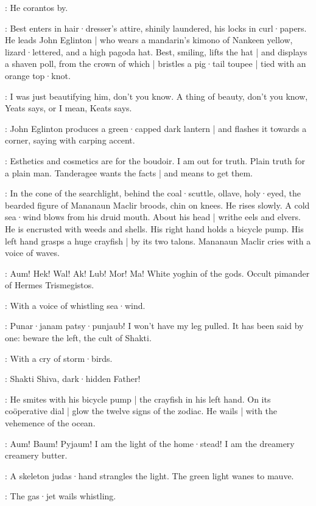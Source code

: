 :
He corantos by.

:
Best enters in hair·dresser's attire,
shinily laundered,
his locks in curl·papers.
He leads John Eglinton |
who wears a mandarin's kimono of Nankeen yellow,
lizard·lettered,
and a high pagoda hat.
Best,
smiling,
lifts the hat |
and displays a shaven poll,
from the crown of which |
bristles a pig·tail toupee |
tied with an orange top·knot.

\Best:
I was just beautifying him,
don't you know.
A thing of beauty,
don't you know,
Yeats says,
or I mean,
Keats says.

:
John Eglinton produces a green·capped dark lantern |
and flashes it towards a corner,
saying with carping accent.

\JohnEglinton:
Esthetics and cosmetics are for the boudoir.
I am out for truth.
Plain truth for a plain man.
Tanderagee wants the facts |
and means to get them.%

:
In the cone of the searchlight,
behind the coal·scuttle,
ollave,
holy·eyed,
the bearded figure of Mananaun Maclir broods,
chin on knees.
He rises slowly.
A cold sea·wind blows from his druid mouth.
About his head |
writhe eels and elvers.
He is encrusted with weeds and shells.
His right hand holds a bicycle pump.
His left hand grasps a huge crayfish |
by its two talons.
Mananaun Maclir cries with a voice of waves.

\MananaunMaclir:
Aum!
Hek!
Wal!
Ak!
Lub!
Mor!
Ma!
White yoghin of the gods.
Occult pimander of Hermes Trismegistos.

:
With a voice of whistling sea·wind.

\MananaunMaclir:
Punar·janam patsy·punjaub!
I won't have my leg pulled.
It has been said by one:
beware the left,
the cult of Shakti.

:
With a cry of storm·birds.

\MananaunMaclir:
Shakti Shiva,
dark·hidden Father!

:
He smites with his bicycle pump |
the crayfish in his left hand.
On its coöperative dial |
glow the twelve signs of the zodiac.
He wails |
with the vehemence of the ocean.

\MananaunMaclir:
Aum!
Baum!
Pyjaum!
I am the light of the home·stead!
I am the dreamery creamery butter.

:
A skeleton judas·hand strangles the light.
The green light wanes to mauve.

:
The gas·jet wails whistling.

